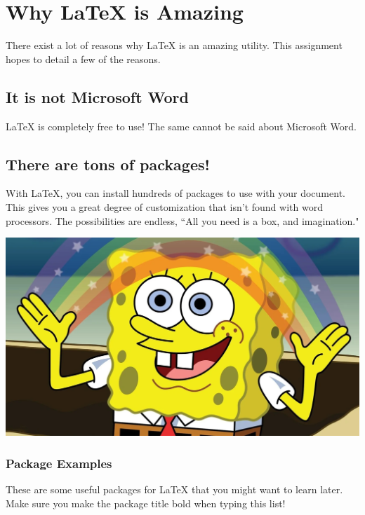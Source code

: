 \section{Why LaTeX is Amazing}

There exist a lot of reasons why LaTeX is an amazing utility. This assignment hopes to detail a few of the reasons.

\subsection{It is not Microsoft Word}

LaTeX is completely free to use! The same cannot be said about Microsoft Word.

\subsection{There are tons of packages!}

With LaTeX, you can install hundreds of packages to use with your document. This gives you a great degree of customization that isn't found with word processors. The possibilities are endless, ``All you need is a box, and imagination."

\begin{center}
    \includegraphics[scale=0.17]{imagination.png}
\end{center}

\subsubsection{Package Examples}

These are some useful packages for LaTeX that you might want to learn later. Make sure you make the package title bold when typing this list!

